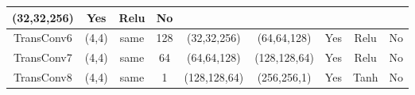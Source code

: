 \documentclass[a4paper,fleqn]{cas-dc}
\begin{document}
\begin{table}[htbp]
\begin{tabular}{|c|c|c|c|c|c|c|c|c|}
  {\color[HTML]{000000} (32,32,256)} &
  {\color[HTML]{000000} Yes} &
  {\color[HTML]{000000} Relu} &
  {\color[HTML]{000000} No} \\ \hline
{\color[HTML]{000000} TransConv6} &
  {\color[HTML]{000000} (4,4)} &
  {\color[HTML]{000000} same} &
  {\color[HTML]{000000} 128} &
  {\color[HTML]{000000} (32,32,256)} &
  {\color[HTML]{000000} (64,64,128)} &
  {\color[HTML]{000000} Yes} &
  {\color[HTML]{000000} Relu} &
  {\color[HTML]{000000} No} \\ \hline
{\color[HTML]{000000} TransConv7} &
  {\color[HTML]{000000} (4,4)} &
  {\color[HTML]{000000} same} &
  {\color[HTML]{000000} 64} &
  {\color[HTML]{000000} (64,64,128)} &
  {\color[HTML]{000000} (128,128,64)} &
  {\color[HTML]{000000} Yes} &
  {\color[HTML]{000000} Relu} &
  {\color[HTML]{000000} No} \\ \hline
{\color[HTML]{000000} TransConv8} &
  {\color[HTML]{000000} (4,4)} &
  {\color[HTML]{000000} same} &
  {\color[HTML]{000000} 1} &
  {\color[HTML]{000000} (128,128,64)} &
  {\color[HTML]{000000} (256,256,1)} &
  {\color[HTML]{000000} Yes} &
  {\color[HTML]{000000} Tanh} &
  {\color[HTML]{000000} No} \\ \hline
\end{tabular}
\label{tab1}
\end{table}
\end{document}
